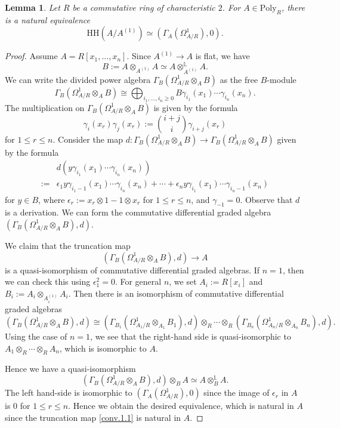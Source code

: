 \documentclass[10pt]{amsart}
\newtheorem{lem}[thm]{Lemma}
\theoremstyle{definition}
\numberwithin{equation}{section}
\renewcommand{\L}{\mathbb{L}}
\newcommand{\Poly}{\mathrm{Poly}}
\newcommand{\HH}{\mathrm{HH}}
\begin{document}
{\begin{lem}
\label{conv.1}
Let $R$ be a commutative ring of characteristic $2$.
For $A\in \Poly_R$,
there is a natural equivalence
\[
\HH(A/A^{(1)})\simeq
(\Gamma_A(\Omega_{A/R}^1),0).
\]
\end{lem}
\begin{proof}
Assume $A=R[x_1,\ldots,x_n]$.
Since $A^{(1)}\to A$ is flat,
we have
\[
B:=A\otimes_{A^{(1)}}A\simeq A\otimes_{A^{(1)}}^\L A.
\]
We can write the divided power algebra $\Gamma_B(\Omega_{A/R}^1\otimes_A B)$ as the free $B$-module
\[
\Gamma_B(\Omega_{A/R}^1\otimes_A B)
\cong
\bigoplus_{i_1,\ldots,i_n\geq 0} B \gamma_{i_1}(x_1)\cdots \gamma_{i_n}(x_n).
\]
The multiplication on  $\Gamma_B(\Omega_{A/R}^1\otimes_A B)$ is given by the formula
\[
\gamma_i(x_r)\gamma_j(x_r)
:=
\binom{i+j}{i}\gamma_{i+j}(x_r)
\]
for $1\leq r\leq n$.
Consider the map $d\colon \Gamma_B(\Omega_{A/R}^1\otimes_A B)\to \Gamma_B(\Omega_{A/R}^1\otimes_A B)$ given by the formula
\begin{align*}
&d(y\gamma_{i_1}(x_1)\cdots \gamma_{i_n}(x_n)) 
\\
:= &
\epsilon_1 y\gamma_{i_1-1}(x_1)\cdots \gamma_{i_n}(x_n)
+
\cdots
+
\epsilon_n y\gamma_{i_1}(x_1)\cdots \gamma_{i_n-1}(x_n)
\end{align*}
for $y\in B$,
where $\epsilon_r:=x_r\otimes 1-1\otimes x_r$ for $1\leq r\leq n$,
and $\gamma_{-1}=0$.
Observe that $d$ is a derivation.
We can form the commutative differential graded algebra $(\Gamma_B(\Omega_{A/R}^1\otimes_A B),d)$.

We claim that the truncation map
\begin{equation}
\label{conv.1.1}
(\Gamma_B(\Omega_{A/R}^1\otimes_A B),d)
\to
A
\end{equation}
is a quasi-isomorphism of commutative differential graded algebras.
If $n=1$,
then we can check this using $\epsilon_1^2=0$.
For general $n$,
we set $A_i:=R[x_i]$ and $B_i:=A_i\otimes_{A_i^{(1)}}A_i$.
Then there is an isomorphism of commutative differential graded algebras
\[
(\Gamma_B(\Omega_{A/R}^1\otimes_A B),d)
\cong
(\Gamma_{B_1}(\Omega_{A_1/R}^1\otimes_{A_1} B_1),d)
\otimes_R
\cdots
\otimes_R
(\Gamma_{B_n}(\Omega_{A_n/R}^1\otimes_{A_n} B_n),d).
\]
Using the case of $n=1$,
we see that the right-hand side is quasi-isomorphic to $A_1\otimes_R \cdots \otimes_R A_n$,
which is isomorphic to $A$.

Hence we have a quasi-isomorphism
\[
(\Gamma_B(\Omega_{A/R}^1\otimes_A B),d)\otimes_B A
\simeq
A\otimes_B^\L A.
\]
The left hand-side is isomorphic to $(\Gamma_A(\Omega_{A/R}^1),0)$ since the image of $\epsilon_r$ in $A$ is $0$ for $1\leq r\leq n$.
Hence we obtain the desired equivalence,
which is natural in $A$ since the truncation map \eqref{conv.1.1} is natural in $A$.
\end{proof}


}
\end{document}
